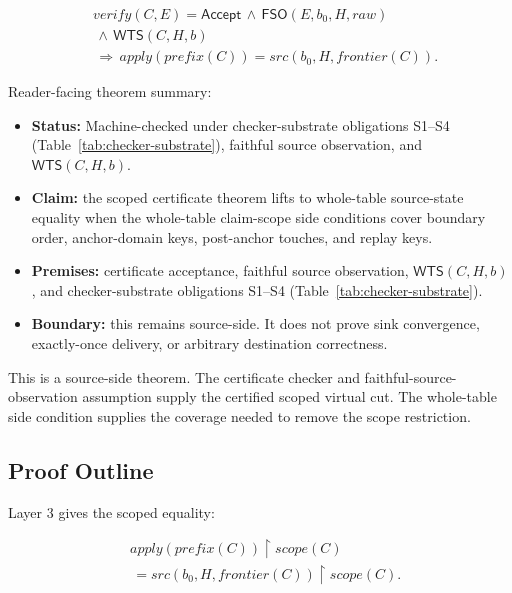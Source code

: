 \documentclass[letterpaper,10pt,twocolumn]{article}
\newcommand{\restrict}{\mathbin{\upharpoonright}}
\newcommand{\Apply}{\mathit{apply}}
\newcommand{\Src}{\mathit{src}}
\newcommand{\Scope}{\mathit{scope}}
\newcommand{\Frontier}{\mathit{frontier}}
\newcommand{\CleanPrefix}{\mathit{prefix}}
\newcommand{\Verify}{\mathit{verify}}
\newcommand{\RawObs}{\mathit{raw}}
\newcommand{\FSO}{\mathsf{FSO}}
\newcommand{\WTS}{\mathsf{WTS}}
\newcommand{\Accept}{\mathsf{Accept}}
\providecommand{\tightlist}{\setlength{\itemsep}{0pt}\setlength{\parskip}{0pt}}
\begin{document}
\[
\begin{aligned}
&\Verify(C,E)=\Accept \,\land\, \FSO(E,b_0,H,\RawObs)\\
&\,\land\, \WTS(C,H,b)\\
&\,\Longrightarrow\, \Apply(\CleanPrefix(C))=\Src(b_0,H,\Frontier(C)).
\end{aligned}
\]

Reader-facing theorem summary:

\begin{itemize}
\tightlist
\item
  \textbf{Status:} Machine-checked under
  checker-substrate obligations S1--S4
  (Table~\ref{tab:checker-substrate}), faithful source observation,
  and $\WTS(C,H,b)$.
\item
  \textbf{Claim:} the scoped certificate theorem lifts to whole-table
  source-state equality when the whole-table claim-scope side conditions
  cover boundary order, anchor-domain keys, post-anchor touches, and
  replay keys.
\item
  \textbf{Premises:} certificate acceptance, faithful source
  observation, $\WTS(C,H,b)$, and checker-substrate obligations
  S1--S4 (Table~\ref{tab:checker-substrate}).
\item
  \textbf{Boundary:} this remains source-side. It does not prove sink
  convergence, exactly-once delivery, or arbitrary destination
  correctness.
\end{itemize}

This is a source-side theorem. The certificate checker and
faithful-source-observation assumption supply the certified scoped
virtual cut. The whole-table side condition supplies the coverage
needed to remove the scope restriction.

\subsection{Proof Outline}\label{proof-roadmap}

Layer 3 gives the scoped equality:

\[
\begin{aligned}
&\Apply(\CleanPrefix(C)) \restrict \Scope(C)\\
&\,= \Src(b_0,H,\Frontier(C)) \restrict \Scope(C).
\end{aligned}
\]
\end{document}

